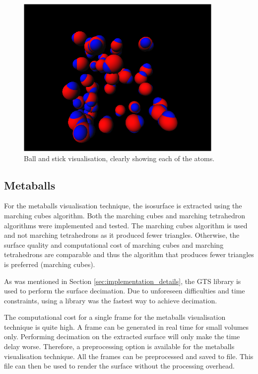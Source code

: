 \begin{figure}[h!]
  \begin{center}
    \includegraphics[width=100mm]{ballstick}
  \end{center}
  \caption{Ball and stick visualisation, clearly showing each of the atoms.}
  \label{fig:implementation_ballstick}
\end{figure}


\subsection{Metaballs}
\label{sub:implementation_metaballs}

For the metaballs visualisation technique, the isosurface is extracted using
the marching cubes algorithm. Both the marching cubes and marching tetrahedron
algorithms were implemented and tested. The marching cubes algorithm is used
and not marching tetrahedrons as it produced fewer triangles. Otherwise, the
surface quality and computational cost of marching cubes and marching
tetrahedrons are comparable and thus the algorithm that produces fewer
triangles is preferred (marching cubes).

As was mentioned in Section \ref{sec:implementation_details}, the GTS library
is used to perform the surface decimation. Due to unforeseen difficulties and
time constraints, using a library was the fastest way to achieve decimation.

The computational cost for a single frame for the metaballs visualisation
technique is quite high. A frame can be generated in real time for small
volumes only. Performing decimation on the extracted surface will only make the
time delay worse. Therefore, a preprocessing option is available for the
metaballs visualisation technique. All the frames can be preprocessed and saved
to file. This file can then be used to render the surface without the
processing overhead.

